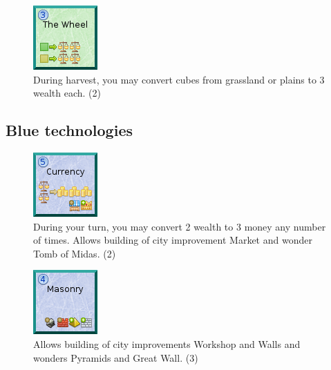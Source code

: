 \documentclass[11pt,a4paper,titlepage]{article}
\begin{document}
{{  \begin{figure}[!htb]
    \begin{minipage}[c]{0.1\textwidth}
      \includegraphics[scale=.7]{doe_tech_wheel.png}
    \end{minipage}\hfill
    \begin{minipage}[c]{0.6\textwidth}
      \captionsetup{labelformat=empty, justification=justified, singlelinecheck=false}
      \caption{During harvest, you may convert cubes from grassland or plains to 3 wealth each. (2)}
    \end{minipage}\hfill
    \label{fig:tech_wheel}
  \end{figure}

  }\label{subsec:green_technologies}
  \newpage
  \subsection{Blue technologies}{

  \begin{figure}[!htb]
    \begin{minipage}[c]{0.1\textwidth}
      \includegraphics[scale=.7]{doe_tech_currency.png}
    \end{minipage}\hfill
    \begin{minipage}[c]{0.6\textwidth}
      \captionsetup{labelformat=empty, justification=justified, singlelinecheck=false}
      \caption{During your turn, you may convert 2 wealth to 3 money any number of times. Allows building of city improvement Market and wonder Tomb of Midas. (2)}
    \end{minipage}\hfill
    \label{fig:tech_currency}
  \end{figure}

  \begin{figure}[!htb]
    \begin{minipage}[c]{0.1\textwidth}
      \includegraphics[scale=.7]{doe_tech_masonry.png}
    \end{minipage}\hfill
    \begin{minipage}[c]{0.6\textwidth}
      \captionsetup{labelformat=empty, justification=justified, singlelinecheck=false}
      \caption{Allows building of city improvements Workshop and Walls and wonders Pyramids and Great Wall. (3)}
    \end{minipage}\hfill
    \label{fig:tech_masonry}
  \end{figure}

}}
\end{document}
